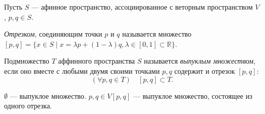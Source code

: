 

\begin{definition}
	Пусть $S$ --- афинное пространство, ассоциированное с веторным пространством $V$, $p, q \in S$.
	
	\textit{Отрезком}, соединяющим точки $p$ и $q$ называется множество $[p, q] = \{x \in S \mid x = \lambda p + (1 - \lambda) q, \lambda \in [0, 1] \subset \mathbb{R}\}$.
\end{definition}

\begin{definition}
	Подмножество $T$ аффинного пространства $S$ называется \textit{выпуклым множеством}, если оно вместе с любыми двумя своими точками $p, q$ содержит и отрезок $[p, q]$:
	\begin{equation*}
		(\forall p, q \in T) \quad [p, q] \subset T.
	\end{equation*}
	
	\begin{figure}[H]
		\centering 
		
	\end{figure}
	
	$\emptyset$ --- выпуклое множество.
	$p, q \in V [p, q]$ --- выпуклое множество, состоящее из одного отрезка.
\end{definition}

